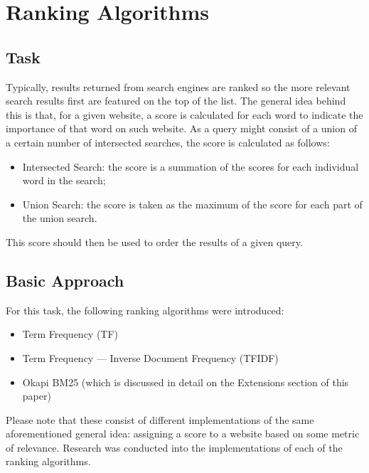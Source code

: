 \chapter{Ranking Algorithms}

\section{Task}
Typically, results returned from search engines are ranked so the more relevant search results first are featured on the top of the list. The general idea behind this is that, for a given website, a score is calculated for each word to indicate the importance of that word on such website.\newline
As a query might consist of a union of a certain number of intersected searches, the score is calculated as follows:
\begin{itemize}
    \item Intersected Search: the score is a summation of the scores for each individual word in the search;
    \item Union Search: the score is taken as the maximum of the score for each part of the union search.
\end{itemize}
This score should then be used to order the results of a given query.

\section{Basic Approach}
For this task, the following ranking algorithms were introduced:
\begin{itemize}
    \item Term Frequency (TF)
    \item Term Frequency — Inverse Document Frequency (TFIDF)
    \item Okapi BM25 (which is discussed in detail on the Extensions section of this paper)
\end{itemize}
Please note that these consist of different implementations of the same aforementioned general idea: assigning a score to a website based on some metric of relevance.\newline
Research was conducted into the implementations of each of the ranking algorithms.

